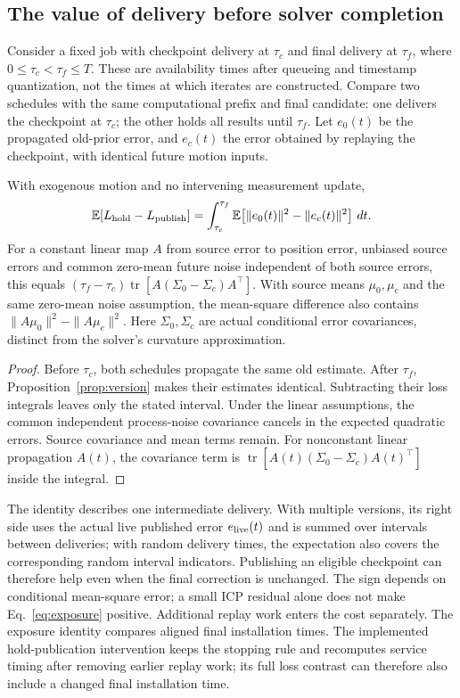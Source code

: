 \subsection{The value of delivery before solver completion}
Consider a fixed job with checkpoint delivery at $\tau_c$ and final delivery at $\tau_f$, where $0\le\tau_c<\tau_f\le T$. These are availability times after queueing and timestamp quantization, not the times at which iterates are constructed. Compare two schedules with the same computational prefix and final candidate: one delivers the checkpoint at $\tau_c$; the other holds all results until $\tau_f$. Let $e_0(t)$ be the propagated old-prior error, and $e_c(t)$ the error obtained by replaying the checkpoint, with identical future motion inputs.
\begin{proposition}\label{prop:exposure}
With exogenous motion and no intervening measurement update,
\begin{equation}
\mathbb E[L_{\rm hold}-L_{\rm publish}]
=\int_{\tau_c}^{\tau_f}\mathbb E\!\left[\|e_0(t)\|^2-\|e_c(t)\|^2\right]\,dt.\label{eq:exposure}
\end{equation}
For a constant linear map $A$ from source error to position error, unbiased source errors and common zero-mean future noise independent of both source errors, this equals $(\tau_f-\tau_c)\operatorname{tr}[A(\Sigma_0-\Sigma_c)A^\top]$. With source means $\mu_0,\mu_c$ and the same zero-mean noise assumption, the mean-square difference also contains $\|A\mu_0\|^2-\|A\mu_c\|^2$. Here $\Sigma_0,\Sigma_c$ are actual conditional error covariances, distinct from the solver's curvature approximation.
\end{proposition}
\begin{proof}
Before $\tau_c$, both schedules propagate the same old estimate. After $\tau_f$, Proposition~\ref{prop:version} makes their estimates identical. Subtracting their loss integrals leaves only the stated interval. Under the linear assumptions, the common independent process-noise covariance cancels in the expected quadratic errors. Source covariance and mean terms remain. For nonconstant linear propagation $A(t)$, the covariance term is $\operatorname{tr}[A(t)(\Sigma_0-\Sigma_c)A(t)^\top]$ inside the integral.
\end{proof}
The identity describes one intermediate delivery. With multiple versions, its right side uses the actual live published error $e_{\rm live}(t)$ and is summed over intervals between deliveries; with random delivery times, the expectation also covers the corresponding random interval indicators. Publishing an eligible checkpoint can therefore help even when the final correction is unchanged. The sign depends on conditional mean-square error; a small ICP residual alone does not make Eq.~\eqref{eq:exposure} positive. Additional replay work enters the cost separately. The exposure identity compares aligned final installation times. The implemented hold-publication intervention keeps the stopping rule and recomputes service timing after removing earlier replay work; its full loss contrast can therefore also include a changed final installation time.

